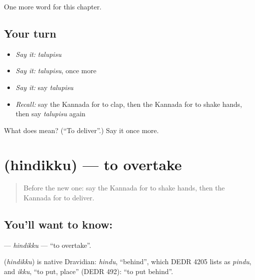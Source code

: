 \begin{grammarlens}[title={What you've built}]
One more word for this chapter.
\end{grammarlens}

\subsection*{Your turn}
\begin{itemize}
\raggedright
  \item \emph{Say it:} \emph{talupisu}
  \item \emph{Say it:} \emph{talupisu}, once more
  \item \emph{Say it:} say \emph{talupisu}
  \item \emph{Recall:} say the Kannada for to clap, then the Kannada for to shake hands, then say \emph{talupisu} again
\end{itemize}

\begin{tcolorbox}[breakable,colback=teal!4,colframe=teal!35!black,title={Before you move on}]
What does  mean? (\textquotedblleft{}To deliver\textquotedblright{}.) Say it once more.
\end{tcolorbox}
\section[\texorpdfstring{\kn{ಹಿಂದಿಕ್ಕು} (hindikku)}{ಹಿಂದಿಕ್ಕು (hindikku)}]{ (hindikku) — to overtake}

\label{lesson:KA-C280-hindikku}



\begin{quote}
Before the new one: say the Kannada for to shake hands, then the Kannada for to deliver.
\end{quote}

\subsection*{You'll want to know: }
\textbf{} — \emph{hindikku} — \textquotedblleft{}to overtake\textquotedblright{}.

\begin{cousinweb}
\textbf{} (\emph{hindikku}) is native Dravidian: \emph{hindu}, \textquotedblleft{}behind\textquotedblright{}, which DEDR 4205 lists as \emph{pindu}, and \emph{ikku}, \textquotedblleft{}to put, place\textquotedblright{} (DEDR 492): \textquotedblleft{}to put behind\textquotedblright{}.
\end{cousinweb}

